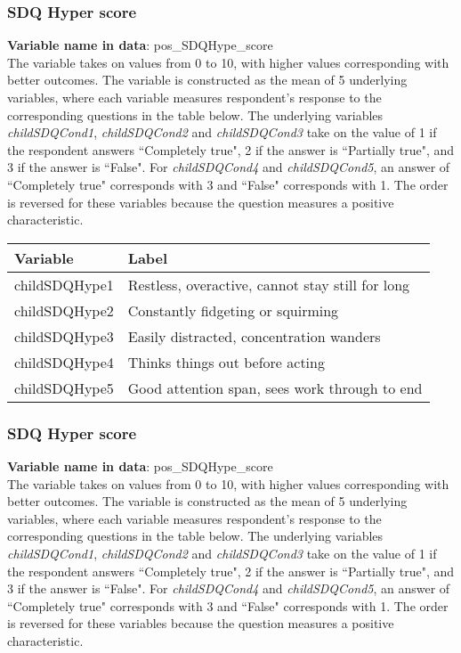 \subsubsection{SDQ Hyper score}
\textbf{Variable name in data}: pos\_SDQHype\_score \\[.3cm]
The variable takes on values from 0 to 10, with higher values corresponding with better outcomes. The variable is constructed as the mean of 5 underlying variables, where each variable measures respondent's response to the corresponding questions in the table below. The underlying variables \textit{childSDQCond1}, \textit{childSDQCond2} and \textit{childSDQCond3} take on the value of 1 if the respondent answers  ``Completely true", 2 if the answer is ``Partially true", and 3 if the answer is ``False". For \textit{childSDQCond4} and \textit{childSDQCond5}, an answer of ``Completely true" corresponds with 3 and ``False" corresponds with 1. The order is reversed for these variables because the question measures a positive characteristic.

\begin{table}[H]
\setlength{\tabcolsep}{20pt}
\begin{center}
\begin{tabular}{l l}
\hline
\textbf{Variable} & \textbf{Label} \\
\hline
childSDQHype1 & Restless, overactive, cannot stay still for long\\
childSDQHype2 & Constantly fidgeting or squirming\\
childSDQHype3 & Easily distracted, concentration wanders\\
childSDQHype4 & Thinks things out before acting \\
childSDQHype5 & Good attention span, sees work through to end\\
\hline
\end{tabular}
\end{center}
\end{table}

\subsubsection{SDQ Hyper score}
\textbf{Variable name in data}: pos\_SDQHype\_score \\[.3cm]
The variable takes on values from 0 to 10, with higher values corresponding with better outcomes. The variable is constructed as the mean of 5 underlying variables, where each variable measures respondent's response to the corresponding questions in the table below. The underlying variables \textit{childSDQCond1}, \textit{childSDQCond2} and \textit{childSDQCond3} take on the value of 1 if the respondent answers  ``Completely true", 2 if the answer is ``Partially true", and 3 if the answer is ``False". For \textit{childSDQCond4} and \textit{childSDQCond5}, an answer of ``Completely true" corresponds with 3 and ``False" corresponds with 1. The order is reversed for these variables because the question measures a positive characteristic.

